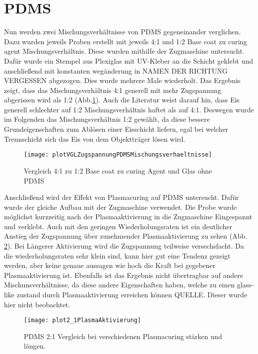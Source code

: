 \section{PDMS}

Nun werden zwei Mischungsverhältnisse von PDMS gegeneinander verglichen. Dazu wurden jeweils Proben erstellt mit jeweils 4:1 und 1:2 Base coat zu curing agent Mischungsverhältnis. Diese wurden mithilfe der Zugmaschine untersucht. Dafür wurde ein Stempel aus Plexiglas mit UV-Kleber an die Schicht geklebt und anschließend mit konstanten wegänderung in NAMEN DER RICHTUNG VERGESSEN abgezogen. Dies wurde mehrere Male wiederholt. Das Ergebnis zeigt, dass das Mischungsverhältnis 4:1 generell mit mehr Zugspannung abgerissen wird als 1:2 (Abb.\ref{fig:vgl4:1zu1:2zuGlas}). Auch die Literatur weist darauf hin, dass Eis generell schlechter auf 1:2 Mischungsverhältnis haftet als auf 4:1\cite{IbanezIbanez.2022}. Deswegen wurde im Folgenden das Mischungsverhältnis 1:2 gewählt, da diese bessere Grundeigenschaften zum Ablösen einer Eisschicht liefern, egal bei welcher Trennschicht sich das Eis von dem Objektträger lösen wird.


\begin{figure}
	\texttt{[image: plotVGLZugspannungPDMSMischungsverhaeltnisse]}
	\caption{Vergleich 4:1 zu 1:2 Base coat zu curing Agent und Glas ohne PDMS}
	\label{fig:vgl4:1zu1:2zuGlas}
\end{figure}


Anschließend wird der Effekt von Plasmacuring auf PDMS untersucht. Dafür wurde der gleiche Aufbau mit der Zugmaschine verwendet. Die Probe wurde möglichst kurzzeitig nach der Plasmaaktivierung in die Zugmaschine Eingespannt und verklebt. Auch mit den geringen Wiederholungsraten ist ein deutlicher Anstieg der Zugspannung über zunehmender Plasmaaktivierung zu sehen (Abb. \ref{fig:PlotPlasmaAktivierung}). Bei Längerer Aktivierung wird die Zugspannung teilweise versechsfacht. Da die wiederholungsraten sehr klein sind, kann hier gut eine Tendenz gezeigt werden, aber keine genaue aussagen wie hoch die Kraft bei gegebener Plasmaaktivierung ist. Ebenfalls ist das Ergebnis nicht übertragbar auf andere Mischunsverhältnisse, da diese andere Eigenschaften haben, welche zu einen glass-like zustand durch Plasmaaktivierung erreichen können QUELLE. Dieser wurde hier nicht beobachtet. 


\begin{figure}[h]
\texttt{[image: plot2\_1PlasmaAktivierung]}
\caption{PDMS 2:1 Vergleich bei verschiedenen Plasmacuring stärken und längen.}
\label{fig:PlotPlasmaAktivierung}
\end{figure}




